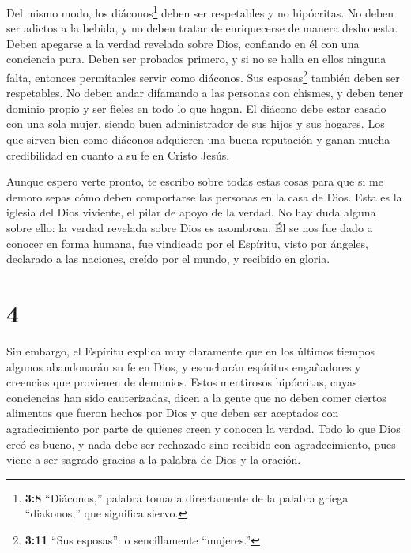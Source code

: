  Del mismo modo, los diáconos\footnote{\textbf{3:8}
  ``Diáconos,'' palabra tomada directamente de la palabra griega
  ``diakonos,'' que significa siervo.} deben ser respetables y no
hipócritas. No deben ser adictos a la bebida, y no deben tratar de
enriquecerse de manera deshonesta.  Deben apegarse a la
verdad revelada sobre Dios, confiando en él con una conciencia pura.
 Deben ser probados primero, y si no se halla en ellos
ninguna falta, entonces permítanles servir como diáconos. 
Sus esposas\footnote{\textbf{3:11} ``Sus esposas'': o sencillamente
  ``mujeres.''} también deben ser respetables. No deben andar difamando
a las personas con chismes, y deben tener dominio propio y ser fieles en
todo lo que hagan.  El diácono debe estar casado con una
sola mujer, siendo buen administrador de sus hijos y sus hogares.
 Los que sirven bien como diáconos adquieren una buena
reputación y ganan mucha credibilidad en cuanto a su fe en Cristo Jesús.

 Aunque espero verte pronto, te escribo sobre todas estas
cosas para que  si me demoro sepas cómo deben comportarse
las personas en la casa de Dios. Esta es la iglesia del Dios viviente,
el pilar de apoyo de la verdad.  No hay duda alguna sobre
ello: la verdad revelada sobre Dios es asombrosa. Él se nos fue dado a
conocer en forma humana, fue vindicado por el Espíritu, visto por
ángeles, declarado a las naciones, creído por el mundo, y recibido en
gloria.

\hypertarget{section-3}{%
\section{4}\label{section-3}}

 Sin embargo, el Espíritu explica muy claramente que en los
últimos tiempos algunos abandonarán su fe en Dios, y escucharán
espíritus engañadores y creencias que provienen de demonios.
 Estos mentirosos hipócritas, cuyas conciencias han sido
cauterizadas,  dicen a la gente que no deben comer ciertos
alimentos que fueron hechos por Dios y que deben ser aceptados con
agradecimiento por parte de quienes creen y conocen la verdad.
 Todo lo que Dios creó es bueno, y nada debe ser rechazado
sino recibido con agradecimiento,  pues viene a ser sagrado
gracias a la palabra de Dios y la oración.

